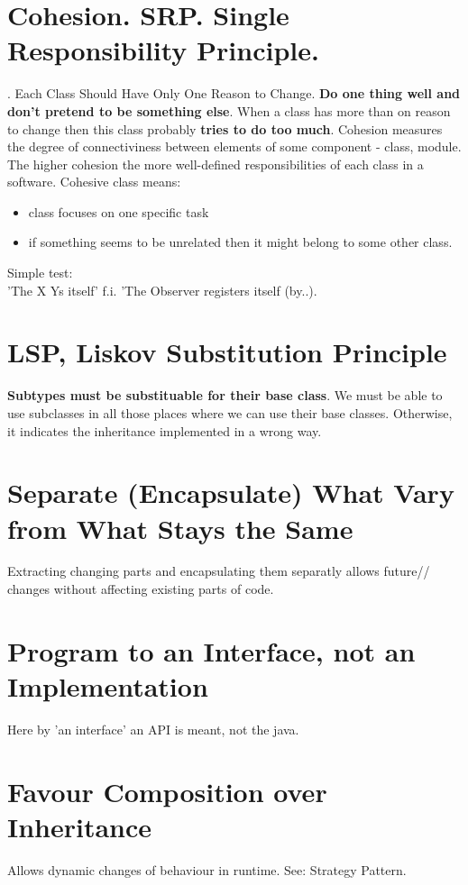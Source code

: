 \documentclass{report}
\begin{document}
\chapter{Cohesion. SRP. Single Responsibility Principle. }.
Each Class Should Have Only One Reason to Change. \textbf{Do one thing well
and don't pretend to be something else}.
When a class has more than on reason to change then this class probably
\textbf{tries to do too much}.
Cohesion measures the degree of connectiviness between elements of some component - class, module.
The higher cohesion the more well-defined responsibilities of each class in a software. 
Cohesive class means:
\begin{itemize}
  \item class focuses on one specific task
  \item if something seems to be unrelated then it might belong to some other class.
\end{itemize}
Simple test:\\
'The X Ys itself'  f.i. 'The Observer registers itself (by..).



\chapter{LSP, Liskov Substitution Principle}
\textbf{Subtypes must be substituable for their base class}.
We must be able to use subclasses in all those places where we can use their base classes.
Otherwise, it indicates the inheritance implemented in a wrong way.



\chapter{Separate (Encapsulate) What Vary from What Stays the Same}
Extracting changing parts and encapsulating them separatly allows future//
changes without affecting existing parts of code.



\chapter{Program to an Interface, not an Implementation}
Here by 'an interface' an API is meant, not the java.



\chapter{Favour Composition over Inheritance}
Allows dynamic changes of behaviour in runtime. See: Strategy Pattern.
\end{document}
